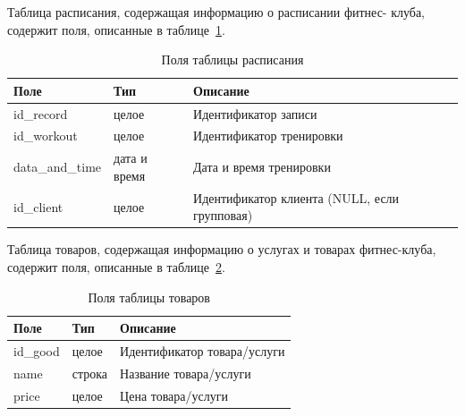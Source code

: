 Таблица расписания, содержащая информацию о расписании фитнес-
клуба, содержит поля, описанные в таблице~\ref{tbl:pol_shed}.
\begin{table}[h!]
	\begin{center}
		\begin{threeparttable}
			\captionsetup{justification=raggedright,singlelinecheck=off}
			\caption{\label{tbl:pol_shed} Поля таблицы расписания}
			\begin{tabular}{|p{4cm}|p{4cm}|p{6cm}|}
				\hline
				Поле & Тип & Описание \\
				\hline
				id\_record & целое & Идентификатор записи \\
				\hline
				id\_workout & целое & Идентификатор тренировки \\
				\hline
				data\_and\_time & дата и время & Дата и время тренировки \\
				\hline
				id\_client & целое & Идентификатор клиента (NULL, если групповая) \\
				\hline
			\end{tabular}
		\end{threeparttable}
	\end{center}
\end{table}

Таблица товаров, содержащая информацию о услугах и товарах фитнес-клуба, содержит поля, описанные в таблице~\ref{tbl:pol_good}.
\begin{table}[h!]
	\begin{center}
		\begin{threeparttable}
			\captionsetup{justification=raggedright,singlelinecheck=off}
			\caption{\label{tbl:pol_good} Поля таблицы товаров}
			\begin{tabular}{|p{4cm}|p{4cm}|p{6cm}|}
				\hline
				Поле & Тип & Описание \\
				\hline
				id\_good & целое & Идентификатор товара/услуги \\
				\hline
				name & строка & Название товара/услуги \\
				\hline
				price & целое & Цена товара/услуги \\
				\hline
			\end{tabular}
		\end{threeparttable}
	\end{center}
\end{table}

